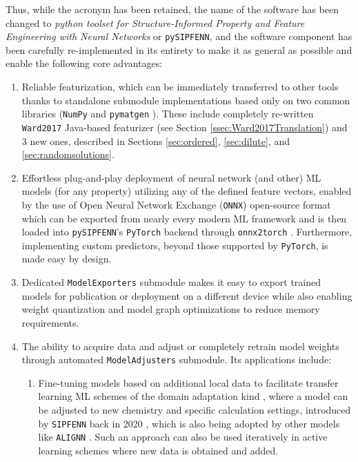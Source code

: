 Thus, while the acronym has been retained, the name of the software has been changed to \textit{python toolset for Structure-Informed Property and Feature Engineering with Neural Networks} or \texttt{pySIPFENN}, and the software component has been carefully re-implemented in its entirety to make it as general as possible and enable the following core advantages:

\begin{enumerate}
    
    \item Reliable featurization, which can be immediately transferred to other tools thanks to standalone submodule implementations based only on two common libraries (\texttt{NumPy} \cite{Harris2020ArrayNumPy} and \texttt{pymatgen} \cite{Ong2013PythonAnalysis}). These include completely re-written \texttt{Ward2017} Java-based featurizer \cite{Ward2017} (see Section \ref{ssec:Ward2017Translation}) and 3 new ones, described in Sections \ref{sec:ordered}, \ref{sec:dilute}, and \ref{sec:randomsolutions}.

    \item Effortless plug-and-play deployment of neural network (and other) ML models (for any property) utilizing any of the defined feature vectors, enabled by the use of Open Neural Network Exchange (\texttt{ONNX}) open-source format \cite{Bai2019ONNX:Exchange} which can be exported from nearly every modern ML framework and is then loaded into \texttt{pySIPFENN}'s \texttt{PyTorch} backend \cite{Paszke2019PyTorch:Library} through \texttt{onnx2torch} \cite{Kalgin2021Onnx2torch:PyTorch}. Furthermore, implementing custom predictors, beyond those supported by \texttt{PyTorch}, is made easy by design.

    \item Dedicated \texttt{ModelExporters} submodule makes it easy to export trained models for publication or deployment on a different device while also enabling weight quantization and model graph optimizations to reduce memory requirements.

    \item The ability to acquire data and adjust or completely retrain model weights through automated \texttt{ModelAdjusters} submodule. Its applications include:
    \begin{enumerate}
        \item Fine-tuning models based on additional local data to facilitate transfer learning ML schemes of the domain adaptation kind \cite{Ben-David2010ADomains}, where a model can be adjusted to new chemistry and specific calculation settings, introduced by \texttt{SIPFENN} back in 2020 \cite{Krajewski2022ExtensibleNetworks}, which is also being adopted by other models like \texttt{ALIGNN} \cite{Gupta2024Structure-awareDatasets}. Such an approach can also be used iteratively in active learning schemes where new data is obtained and added.
        

\end{enumerate}
\end{enumerate}
